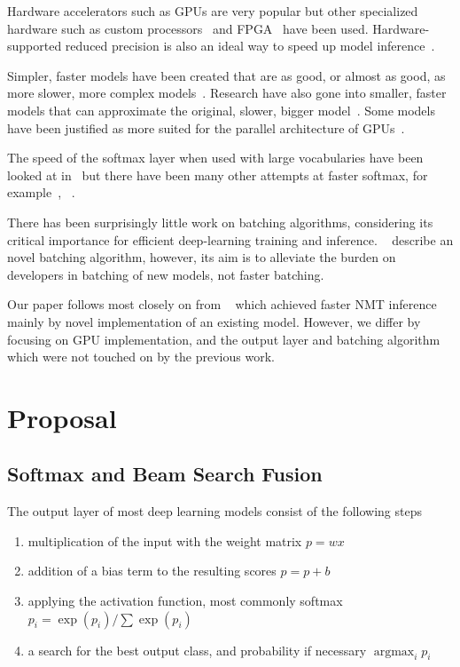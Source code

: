 \documentclass[11pt,a4paper]{article}
\DeclareMathOperator*{\argmax}{argmax}
\begin{document}
Hardware accelerators such as GPUs are very popular but other specialized hardware such as custom processors~\citep{DBLP:journals/corr/JouppiYPPABBBBB17} and FPGA~\citep{DBLP:journals/corr/LaceyTA16} have been used. Hardware-supported reduced precision is also an ideal way to speed up model inference~\citep{DBLP:journals/corr/abs-1710-03740}.

Simpler, faster models have been created that are as good, or almost as good, as more slower, more complex models~\citep{DBLP:journals/corr/BahdanauCB14}. Research have also gone into smaller, faster models that can approximate the original, slower, bigger model~\citep{DBLP:conf/emnlp/KimR16}. Some models have been justified as more suited for the parallel architecture of GPUs~\cite{DBLP:journals/corr/VaswaniSPUJGKP17}.

The speed of the softmax layer when used with large vocabularies have been looked at in~\citep{DBLP:journals/corr/GraveJCGJ16} but there have been many other attempts at faster softmax, for example~\cite{DBLP:journals/corr/abs-1301-3781}, ~\cite{Zoph-2016}.

There has been surprisingly little work on batching algorithms, considering its critical importance for efficient deep-learning training and inference. ~\cite{Neubig-autobatching} describe an novel batching algorithm, however, its aim is to alleviate the burden on developers in batching of new models, not faster batching.

Our paper follows most closely on from ~\cite{DBLP:conf/emnlp/Devlin17} which achieved faster NMT inference mainly by novel implementation of an existing model. However, we differ by focusing on GPU implementation, and the output layer and batching algorithm which were not touched on by the previous work.

\section{Proposal}
\label{sec:Proposal}

\subsection{Softmax and Beam Search Fusion}

The output layer of most deep learning models consist of the following steps
\begin{enumerate}
   \item \vspace{-2 mm} multiplication of the input with the weight matrix $p = w x$
   \item \vspace{-2 mm} addition of a bias term to the resulting scores $p = p + b$
   \item \vspace{-2 mm} applying the activation function, most commonly softmax $ p_i = \exp(p_i) / \sum \exp(p_i) $
   \item \vspace{-2 mm} a search for the best output class, and probability if necessary $\argmax_i p_i$
\end{enumerate}
\end{document}

